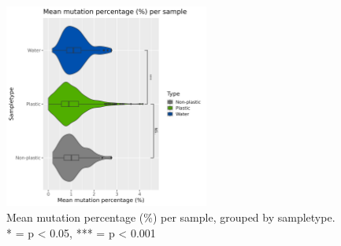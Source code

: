 \begin{figure}[h!]
    \centering
    \includegraphics[width = 0.6\textwidth]{figure/mean_samples_sampletype.png}
    \caption{Mean mutation percentage (\%) per sample, grouped by sampletype. * = p < 0.05, *** = p < 0.001}
    \label{mean_samples_sampletype}
\end{figure}



